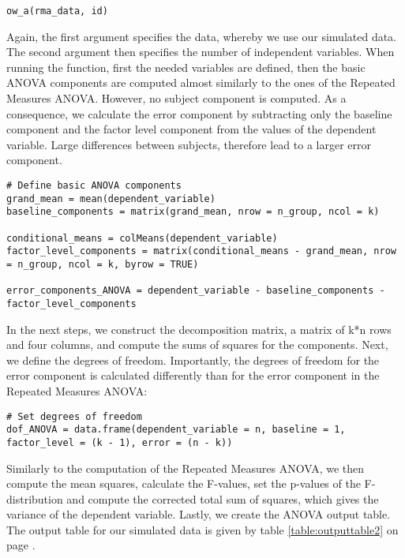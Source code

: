 \documentclass[11pt]{article}
\begin{document}
\begin{lstlisting}
ow_a(rma_data, id)
\end{lstlisting}
		
					Again, the first argument specifies the data, whereby we use our simulated data. The second argument then specifies the number of independent variables. When running the function, first the needed variables are defined, then the basic ANOVA components are computed almost similarly to the ones of the Repeated Measures ANOVA. However, no subject component is computed. As a consequence, we calculate the error component by subtracting only the baseline component and the factor level component from the values of the dependent variable. Large differences between subjects, therefore lead to a larger error component.\\
							
\begin{lstlisting}
# Define basic ANOVA components
grand_mean = mean(dependent_variable)
baseline_components = matrix(grand_mean, nrow = n_group, ncol = k)
        
conditional_means = colMeans(dependent_variable)
factor_level_components = matrix(conditional_means - grand_mean, nrow = n_group, ncol = k, byrow = TRUE)
        
error_components_ANOVA = dependent_variable - baseline_components - factor_level_components
\end{lstlisting}       
        
					In the next steps, we construct the decomposition matrix, a matrix of k*n rows and four columns, and compute the sums of squares for the components. Next, we define the degrees of freedom. Importantly, the degrees of freedom for the error component is calculated differently than for the error component in the Repeated Measures ANOVA:\\
        
\begin{lstlisting}   
# Set degrees of freedom
dof_ANOVA = data.frame(dependent_variable = n, baseline = 1, factor_level = (k - 1), error = (n - k))
\end{lstlisting}          
        
					Similarly to the computation of the Repeated Measures ANOVA, we then compute the mean squares, calculate the F-values, set the p-values of the F-distribution and compute the corrected total sum of squares, which gives the variance of the dependent variable. Lastly, we create the ANOVA output table. The output table for our simulated data is given by table \ref{table:outputtable2} on page \pageref{table:outputtable2}.\\
					
\end{document}
